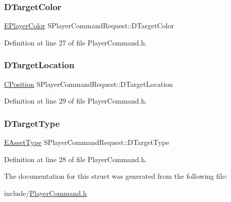 \subsubsection{\texorpdfstring{D\+Target\+Color}{DTargetColor}}
{\footnotesize\ttfamily \hyperlink{GameDataTypes_8h_aafb0ca75933357ff28a6d7efbdd7602f}{E\+Player\+Color} S\+Player\+Command\+Request\+::\+D\+Target\+Color}



Definition at line 27 of file Player\+Command.\+h.

\hypertarget{structSPlayerCommandRequest_a701702b94ca2fd2738e95ef6711dd41a}{}\label{structSPlayerCommandRequest_a701702b94ca2fd2738e95ef6711dd41a} 
\subsubsection{\texorpdfstring{D\+Target\+Location}{DTargetLocation}}
{\footnotesize\ttfamily \hyperlink{classCPosition}{C\+Position} S\+Player\+Command\+Request\+::\+D\+Target\+Location}



Definition at line 29 of file Player\+Command.\+h.

\hypertarget{structSPlayerCommandRequest_a864e47c641127665751091876a6d3c5e}{}\label{structSPlayerCommandRequest_a864e47c641127665751091876a6d3c5e} 
\subsubsection{\texorpdfstring{D\+Target\+Type}{DTargetType}}
{\footnotesize\ttfamily \hyperlink{GameDataTypes_8h_a5600d4fc433b83300308921974477fec}{E\+Asset\+Type} S\+Player\+Command\+Request\+::\+D\+Target\+Type}



Definition at line 28 of file Player\+Command.\+h.



The documentation for this struct was generated from the following file\+:\begin{DoxyCompactItemize}
\item 
include/\hyperlink{PlayerCommand_8h}{Player\+Command.\+h}\end{DoxyCompactItemize}
